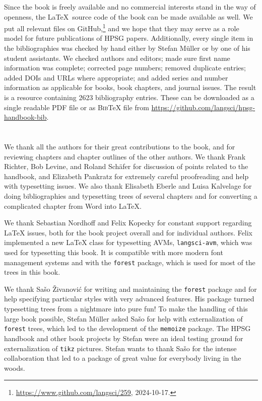 \begin{refsection}
Since the book is freely available and no commercial interests stand in the way of openness, the \LaTeX\ source code of the book can be made available as well.
We put all relevant files on GitHub,\footnote{
\url{https://www.github.com/langsci/259}, 2024-10-17.
} and we hope that they may serve as a role model for future publications of HPSG papers.
Additionally, every single item in the bibliographies was checked by hand either by Stefan Müller or by one of his student assistants. 
We checked authors and editors; made sure first name information was complete; corrected page numbers; removed duplicate entries; added DOIs and URLs where appropriate; and added series and number information as applicable for books, book chapters, and journal issues.
The result is a resource containing 2623 bibliography entries.
These can be downloaded as a single readable PDF file or as \textsc{Bib}\TeX{} file from \url{https://github.com/langsci/hpsg-handbook-bib}.






\section{\acknowledgmentsUS}

We thank all the authors for their great contributions to the book, and for
reviewing chapters and chapter outlines of the other authors. We thank
Frank Richter, Bob Levine, and Roland Schäfer for discussion of points related to the handbook, and
Elizabeth Pankratz for extremely careful proofreading and help with typesetting issues. We also
thank Elisabeth Eberle and Luisa Kalvelage for doing bibliographies and typesetting trees of several
chapters and for converting a complicated chapter from Word into \LaTeX.

We thank Sebastian Nordhoff and Felix Kopecky for constant support regarding \LaTeX{} issues, both for
the book project overall and for individual authors. Felix implemented a new \LaTeX{} class for
typesetting AVMs, \texttt{langsci-avm}, which was used for typesetting this book. It is compatible with more
modern font management systems and with the \texttt{forest} package, which is used for most of the trees in this book.

We thank Sašo Živanović for writing and maintaining the \texttt{forest} package and for help
specifying particular styles with very advanced features. His package turned typesetting trees from a
nightmare into pure fun! To make the handling of this large book possible, Stefan Müller asked Sašo
for help with externalization of \texttt{forest} trees, which led to the development of
the \texttt{memoize} package. The HPSG handbook and other book projects by Stefan were an
ideal testing ground for externalization of \texttt{tikz} pictures. Stefan wants to thank
Sašo for the intense collaboration that led to a package of great value for everybody
living in the woods.



\end{refsection}
